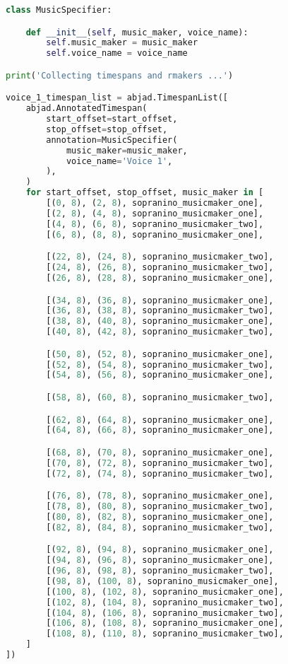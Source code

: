 \begin{lstlisting}[language=Python, caption=Invocation Source Code]
class MusicSpecifier:

    def __init__(self, music_maker, voice_name):
        self.music_maker = music_maker
        self.voice_name = voice_name

print('Collecting timespans and rmakers ...')

voice_1_timespan_list = abjad.TimespanList([
    abjad.AnnotatedTimespan(
        start_offset=start_offset,
        stop_offset=stop_offset,
        annotation=MusicSpecifier(
            music_maker=music_maker,
            voice_name='Voice 1',
        ),
    )
    for start_offset, stop_offset, music_maker in [
        [(0, 8), (2, 8), sopranino_musicmaker_one],
        [(2, 8), (4, 8), sopranino_musicmaker_one],
        [(4, 8), (6, 8), sopranino_musicmaker_two],
        [(6, 8), (8, 8), sopranino_musicmaker_one],

        [(22, 8), (24, 8), sopranino_musicmaker_two],
        [(24, 8), (26, 8), sopranino_musicmaker_two],
        [(26, 8), (28, 8), sopranino_musicmaker_one],

        [(34, 8), (36, 8), sopranino_musicmaker_one],
        [(36, 8), (38, 8), sopranino_musicmaker_two],
        [(38, 8), (40, 8), sopranino_musicmaker_one],
        [(40, 8), (42, 8), sopranino_musicmaker_two],

        [(50, 8), (52, 8), sopranino_musicmaker_one],
        [(52, 8), (54, 8), sopranino_musicmaker_two],
        [(54, 8), (56, 8), sopranino_musicmaker_one],

        [(58, 8), (60, 8), sopranino_musicmaker_two],

        [(62, 8), (64, 8), sopranino_musicmaker_one],
        [(64, 8), (66, 8), sopranino_musicmaker_one],

        [(68, 8), (70, 8), sopranino_musicmaker_one],
        [(70, 8), (72, 8), sopranino_musicmaker_two],
        [(72, 8), (74, 8), sopranino_musicmaker_two],

        [(76, 8), (78, 8), sopranino_musicmaker_one],
        [(78, 8), (80, 8), sopranino_musicmaker_two],
        [(80, 8), (82, 8), sopranino_musicmaker_one],
        [(82, 8), (84, 8), sopranino_musicmaker_two],

        [(92, 8), (94, 8), sopranino_musicmaker_one],
        [(94, 8), (96, 8), sopranino_musicmaker_one],
        [(96, 8), (98, 8), sopranino_musicmaker_two],
        [(98, 8), (100, 8), sopranino_musicmaker_one],
        [(100, 8), (102, 8), sopranino_musicmaker_one],
        [(102, 8), (104, 8), sopranino_musicmaker_two],
        [(104, 8), (106, 8), sopranino_musicmaker_two],
        [(106, 8), (108, 8), sopranino_musicmaker_one],
        [(108, 8), (110, 8), sopranino_musicmaker_two],
    ]
])


\end{lstlisting}

